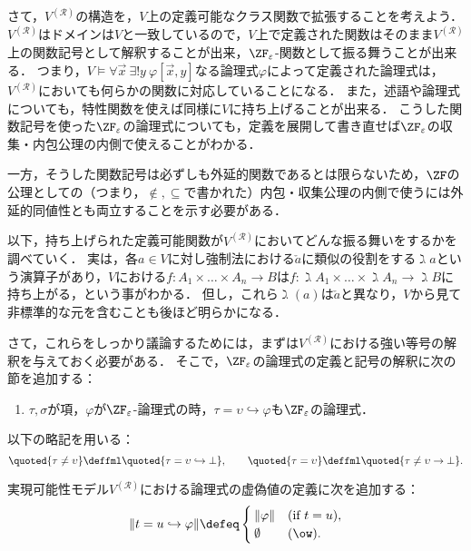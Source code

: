 \documentclass[realisability.tex]{subfiles}
\begin{document}
さて，$V^{(\mathcal{R})}$の構造を，$V$上の定義可能なクラス関数で拡張することを考えよう．
$V^{(\mathcal{R})}$はドメインは$V$と一致しているので，$V$上で定義された関数はそのまま$V^{(\mathcal{R})}$上の関数記号として解釈することが出来，$\ZFe$-関数として振る舞うことが出来る．
つまり，$V \models \forall \vec{x} \: \exists! y \: \varphi[\vec{x}, y]$なる論理式$\varphi$によって定義された論理式は，$V^{(\mathcal{R})}$においても何らかの関数に対応していることになる．
また，述語や論理式についても，特性関数を使えば同様に$V$に持ち上げることが出来る．
こうした関数記号を使った$\ZF_\varepsilon$の論理式についても，定義を展開して書き直せば$\ZF_\varepsilon$の収集・内包公理の内側で使えることがわかる．

一方，そうした関数記号は必ずしも外延的関数であるとは限らないため，$\ZF$の公理としての（つまり，${\notin}, {\subseteq}$で書かれた）内包・収集公理の内側で使うには外延的同値性とも両立することを示す必要がある．

以下，持ち上げられた定義可能関数が$V^{(\mathcal{R})}$においてどんな振る舞いをするかを調べていく．
実は，各$a \in V$に対し強制法における$\check{a}$に類似の役割をする$\gimel a$という演算子があり，$V$における$f: A_1 \times \dots \times A_n \to B$は$f: \gimel A_1 \times \dots \times \gimel A_n \to \gimel B$に持ち上がる，という事がわかる．
但し，これら$\gimel(a)$は$\check{a}$と異なり，$V$から見て非標準的な元を含むことも後ほど明らかになる．

さて，これらをしっかり議論するためには，まずは$V^{(\mathcal{R})}$における強い等号の解釈を与えておく必要がある．
そこで，$\ZF_{\varepsilon}$の論理式の定義と記号の解釈に次の節を追加する：

\begin{definition}
 \begin{enumerate}[resume*=fml-def]
  \item $\tau, \sigma$が項，$\varphi$が$\ZF_{\varepsilon}$-論理式の時，$\tau = \upsilon \hookrightarrow \varphi$も$\ZF_{\varepsilon}$の論理式．
 \end{enumerate}
 以下の略記を用いる：
 \[
  \quoted{\tau \neq \upsilon} \deffml \quoted{\tau = \upsilon \hookrightarrow \bot},\qquad
  \quoted{\tau = \upsilon} \deffml \quoted{\tau \neq \upsilon \to \bot}.
 \]

 実現可能性モデル$V^{(\mathcal{R})}$における論理式の虚偽値の定義に次を追加する：
 \[
  \| t = u \hookrightarrow \varphi \|
   \defeq
   \begin{cases}
    \| \varphi \| & (\text{if } t = u),\\
    \emptyset & (\ow).
   \end{cases}
 \]
\end{definition}
\end{document}
